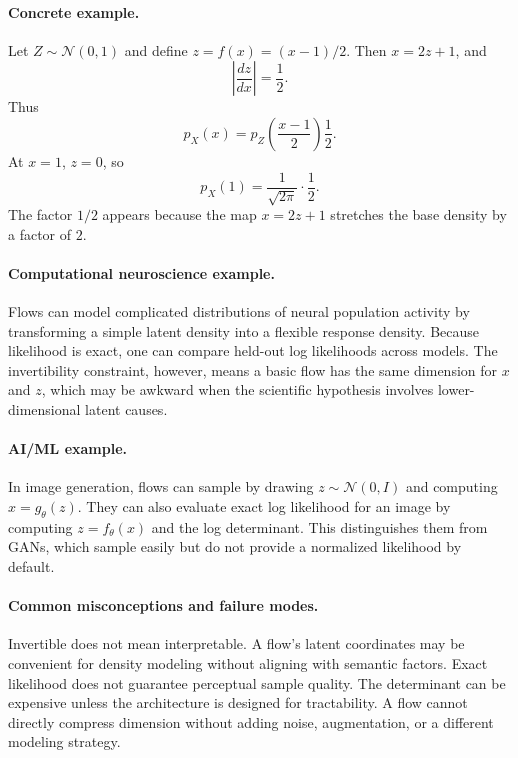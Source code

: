 \paragraph{Concrete example.}
Let \(Z\sim\mathcal N(0,1)\) and define \(z=f(x)=(x-1)/2\). Then \(x=2z+1\), and
\[
\left|\frac{dz}{dx}\right|=\frac12.
\]
Thus
\[
p_X(x)=p_Z\left(\frac{x-1}{2}\right)\frac12.
\]
At \(x=1\), \(z=0\), so
\[
p_X(1)=\frac{1}{\sqrt{2\pi}}\cdot\frac12.
\]
The factor \(1/2\) appears because the map \(x=2z+1\) stretches the base density by a factor of \(2\).

\paragraph{Computational neuroscience example.}
Flows can model complicated distributions of neural population activity by transforming a simple latent density into a flexible response density. Because likelihood is exact, one can compare held-out log likelihoods across models. The invertibility constraint, however, means a basic flow has the same dimension for \(x\) and \(z\), which may be awkward when the scientific hypothesis involves lower-dimensional latent causes.

\paragraph{AI/ML example.}
In image generation, flows can sample by drawing \(z\sim\mathcal N(0,I)\) and computing \(x=g_\theta(z)\). They can also evaluate exact log likelihood for an image by computing \(z=f_\theta(x)\) and the log determinant. This distinguishes them from GANs, which sample easily but do not provide a normalized likelihood by default.

\paragraph{Common misconceptions and failure modes.}
Invertible does not mean interpretable. A flow's latent coordinates may be convenient for density modeling without aligning with semantic factors. Exact likelihood does not guarantee perceptual sample quality. The determinant can be expensive unless the architecture is designed for tractability. A flow cannot directly compress dimension without adding noise, augmentation, or a different modeling strategy.

